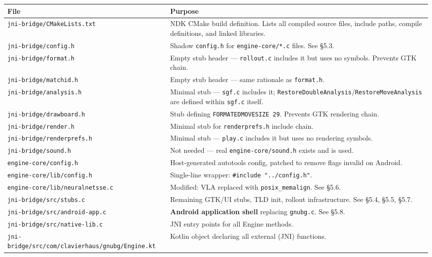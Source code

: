 \documentclass[11pt,a4paper]{article}
\begin{document}
\begin{longtable}[]{@{}
  >{\raggedright\arraybackslash}p{}
  >{\raggedright\arraybackslash}p{}@{}}
\toprule\noalign{}
\begin{minipage}[b]{\linewidth}\raggedright
File
\end{minipage} & \begin{minipage}[b]{\linewidth}\raggedright
Purpose
\end{minipage} \\
\midrule\noalign{}
\endhead
\bottomrule\noalign{}
\endlastfoot
\texttt{jni-bridge/CMakeLists.txt} & NDK CMake build definition. Lists
all compiled source files, include paths, compile definitions, and
linked libraries. \\
\texttt{jni-bridge/config.h} & Shadow \texttt{config.h} for
\texttt{engine-core/*.c} files. See §5.3. \\
\texttt{jni-bridge/format.h} & Empty stub header --- \texttt{rollout.c}
includes it but uses no symbols. Prevents GTK chain. \\
\texttt{jni-bridge/matchid.h} & Empty stub header --- same rationale as
\texttt{format.h}. \\
\texttt{jni-bridge/analysis.h} & Minimal stub --- \texttt{sgf.c}
includes it; \texttt{RestoreDoubleAnalysis}/\texttt{RestoreMoveAnalysis}
are defined within \texttt{sgf.c} itself. \\
\texttt{jni-bridge/drawboard.h} & Stub defining
\texttt{FORMATEDMOVESIZE\ 29}. Prevents GTK rendering chain. \\
\texttt{jni-bridge/render.h} & Minimal stub for \texttt{renderprefs.h}
include chain. \\
\texttt{jni-bridge/renderprefs.h} & Minimal stub --- \texttt{play.c}
includes it but uses no rendering symbols. \\
\texttt{jni-bridge/sound.h} & Not needed --- real
\texttt{engine-core/sound.h} exists and is used. \\
\texttt{engine-core/config.h} & Host-generated autotools config, patched
to remove flags invalid on Android. \\
\texttt{engine-core/lib/config.h} & Single-line wrapper:
\texttt{\#include\ "../config.h"}. \\
\texttt{engine-core/lib/neuralnetsse.c} & Modified: VLA replaced with
\texttt{posix\_memalign}. See §5.6. \\
\texttt{jni-bridge/src/stubs.c} & Remaining GTK/UI stubs, TLD init,
rollout infrastructure. See §5.4, §5.5, §5.7. \\
\texttt{jni-bridge/src/android-app.c} & \textbf{Android application
shell} replacing \texttt{gnubg.c}. See §5.8. \\
\texttt{jni-bridge/src/native-lib.c} & JNI entry points for all Engine
methods. \\
\texttt{jni-bridge/src/com/clavierhaus/gnubg/Engine.kt} & Kotlin object
declaring all external (JNI) functions. \\
\end{longtable}
\end{document}
